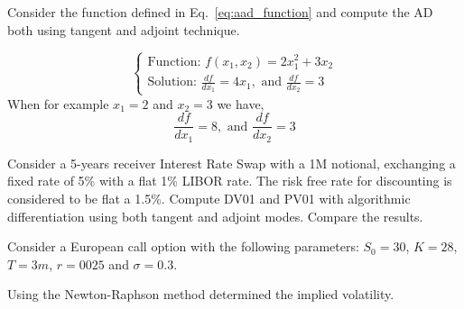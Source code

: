 \documentclass[12pt,a4paper]{book}
\begin{document}
\begin{question}[subtitle=AD for a Simple Function (\texttt{python})]
Consider the function defined in Eq.~\ref{eq:aad_function} and compute the AD both using tangent and adjoint technique.
\end{question}

\begin{solution}
\begin{equation}
\begin{cases}
\text{Function: } f(x_1, x_2) = 2x_1^2 + 3x_2\\
\text{Solution: } \frac{df}{dx_1} = 4x_1, \text{ and } \frac{df}{dx_2}=3
\end{cases}
\end{equation}
When for example $x_1=2$ and $x_2 = 3$ we have,
\begin{equation}
\frac{df}{dx_1} = 8, \text{ and } \frac{df}{dx_2}=3
\end{equation}
\end{solution}

\begin{question}[subtitle=AD for a Swap (\texttt{python})]
Consider a 5-years receiver Interest Rate Swap with a 1M notional, exchanging a fixed rate of 5\% with a flat 1\% LIBOR rate. The risk free rate for discounting is considered to be flat a 1.5\%.
Compute DV01 and PV01 with algorithmic differentiation using both tangent and adjoint modes. Compare the results.
\end{question}

\begin{question}[subtitle=BS Implied Volatility (\texttt{python})]
Consider a European call option with the following parameters: $S_0=30$, $K=28$, $T=3m$, $r=0025$ and $\sigma=0.3$.

Using the Newton-Raphson method determined the implied volatility.
\end{question}
\end{document}
